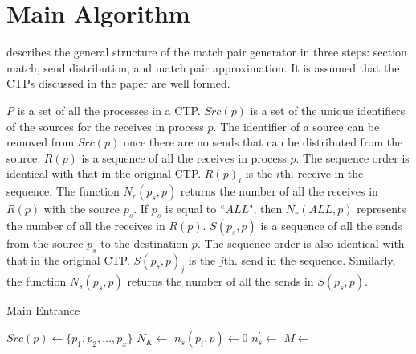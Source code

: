 \section{Main Algorithm}


 describes the general structure of the match pair generator in three steps: section match, send distribution, and match pair approximation. It is assumed that the CTPs discussed in the paper are well formed. 

$\mathit{P}$ is a set of all the processes in a CTP. 
$Src(p)$ is a set of the unique identifiers of the sources for the receives in process $p$. The identifier of a source can be removed from $Src(p)$ once there are no sends that can be distributed from the source.
$R(p)$ is a sequence of all the receives in process $p$. The sequence order is identical with that in the original CTP. $R(p)_i$ is the $i$th. receive in the sequence.
The function $N_r(p_{s},p)$ returns the number of all the receives in $R(p)$ with the source $p_{s}$. If $p_{s}$ is equal to ``$ALL$", then $N_r(ALL ,p)$ represents the number of all the receives in $R(p)$.
$S(p_{s},p)$ is a sequence of all the sends from the source $p_{s}$ to the destination $p$. The sequence order is also identical with that in the original CTP. $S(p_{s},p)_j$ is the $j$th. send in the sequence.
Similarly, the function $N_s(p_{s},p)$ returns the number of all the sends in $S(p_{s},p)$. 

\begin{algorithm}
\caption{Main Entrance}\label{algo:main}
\begin{algorithmic}[1]
\State $Src(p)\gets\{p_1,p_2,\ldots,p_x\}$   
\State $N_K\gets$
\State $\mathit{n_s}(p_i,p)\gets 0$
\EndFor
\State $\mathit{n_s^\prime}\gets$
\State $M\gets$
\State {} 
\State {}
\EndFor
\EndWhile
\EndFor
\end{algorithmic}
\end{algorithm}

